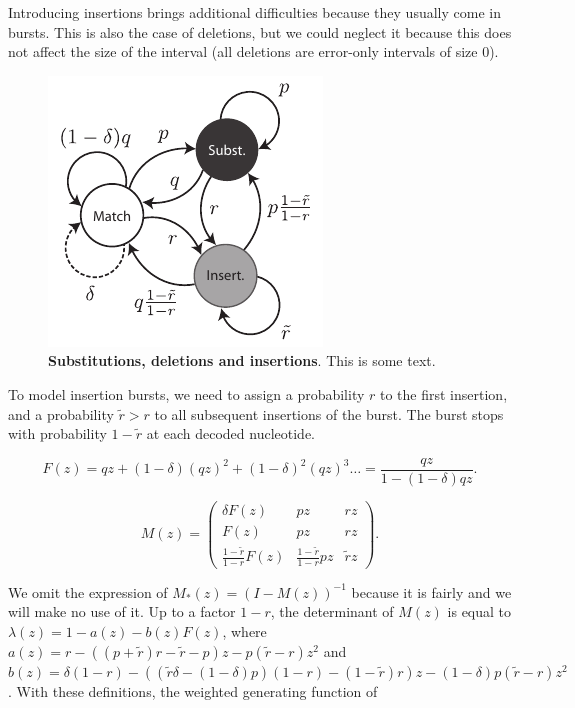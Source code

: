 \documentclass{article}
\begin{document}
Introducing insertions brings additional difficulties because they usually
come in bursts. This is also the case of deletions, but we could neglect
it because this does not affect the size of the interval (all deletions
are error-only intervals of size $0$).

\begin{figure}[h]
\centering
\includegraphics[scale=0.9]{insertions.pdf}
\caption{\textbf{Substitutions, deletions and insertions}.
This is some text.}
\label{fig:insertions}
\end{figure}

To model insertion bursts, we need to assign a probability $r$ to the
first insertion, and a probability $\tilde{r} > r$ to all subsequent
insertions of the burst. The burst stops with probability $1-\tilde{r}$ at
each decoded nucleotide.

\begin{equation*}
F(z) = qz + (1-\delta)(qz)^2 + (1-\delta)^2(qz)^3 \ldots =
\frac{qz}{1-(1-\delta)qz}.
\end{equation*}

\begin{equation*}
M(z) = \left(
\begin{matrix}
\delta F(z) & pz      & rz  \\
F(z)        & pz      & rz  \\
\frac{1-\tilde{r}}{1-r}F(z)   & \frac{1-\tilde{r}}{1-r}pz & \tilde{r}z
\end{matrix}
\right).
\end{equation*}

We omit the expression of $M_*(z) = (I-M(z))^{-1}$ because it is fairly
and we will make no use of it. Up to a factor $1-r$, the determinant of
$M(z)$ is equal to $\lambda(z) = 1 - a(z) - b(z)F(z)$, where $a(z) =
r-((p+\tilde{r})r-\tilde{r}-p)z - p(\tilde{r}-r)z^2$ and $b(z) =
\delta(1-r) - \left((\tilde{r}\delta-(1-\delta)p)(1-r)
-(1-\tilde{r})r\right)z -(1-\delta)p(\tilde{r}-r)z^2$. With these
definitions, the weighted generating function of 
\end{document}
